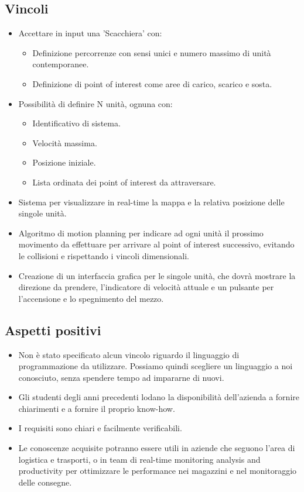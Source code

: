 \subsection{Vincoli}
\begin{itemize}
\item Accettare in input una 'Scacchiera' con:
\begin{itemize}
	\item Definizione percorrenze con sensi unici e numero massimo di unità contemporanee.
	\item Definizione di point of interest come aree di carico, scarico e sosta.
\end{itemize}
\item Possibilità di definire N unità, ognuna con:
\begin{itemize}
	\item Identificativo di sistema.
	\item Velocità massima.
	\item Posizione iniziale.
	\item Lista ordinata dei point of interest da attraversare.
\end{itemize}
\item Sistema per visualizzare in real-time la mappa e la relativa posizione delle singole unità.
\item Algoritmo di motion planning per indicare ad ogni unità il prossimo movimento da effettuare per arrivare al point of interest successivo, evitando le collisioni e rispettando i vincoli dimensionali.
\item Creazione di un interfaccia grafica per le singole unità, che dovrà mostrare la direzione da prendere, l'indicatore di velocità attuale e un pulsante per l'accensione e lo spegnimento del mezzo.
\end{itemize}

\subsection{Aspetti positivi}
\begin{itemize}
\item Non è stato specificato alcun vincolo riguardo il linguaggio di programmazione da utilizzare. Possiamo quindi scegliere un linguaggio a noi conosciuto, senza spendere tempo ad impararne di nuovi.
\item Gli studenti degli anni precedenti lodano la disponibilità dell'azienda a fornire chiarimenti e a fornire il proprio know-how.
\item I requisiti sono chiari e facilmente verificabili.
\item Le conoscenze acquisite potranno essere utili in aziende che seguono l'area di logistica e trasporti, o in team di real-time monitoring analysis and productivity per ottimizzare le performance nei magazzini e nel monitoraggio delle consegne.
\end{itemize}

